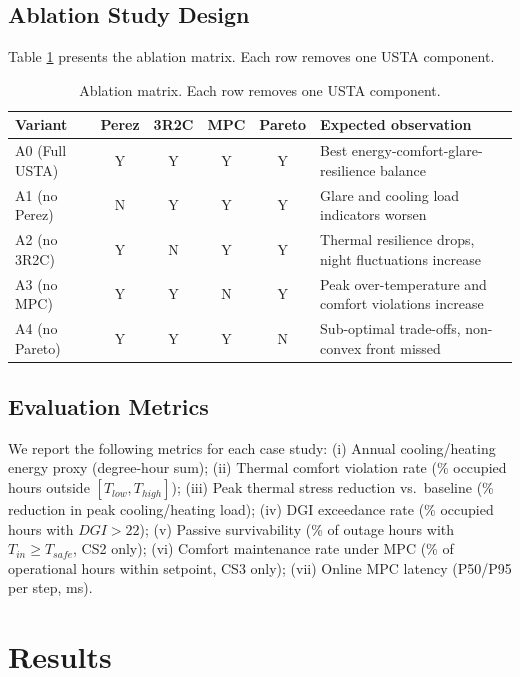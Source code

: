 \documentclass[5p,times,twocolumn]{elsarticle}
\begin{document}
\subsection{Ablation Study Design}

Table \ref{tab:ablation-design} presents the ablation matrix. Each row removes one USTA component.

\begin{table}[!t]
\centering
\small
\caption{Ablation matrix. Each row removes one USTA component.}
\label{tab:ablation-design}
\begin{tabularx}{\textwidth}{@{} l c c c c >{\raggedright\arraybackslash}X @{}}
\toprule
\textbf{Variant} & \textbf{Perez} & \textbf{3R2C} & \textbf{MPC} & \textbf{Pareto} & \textbf{Expected observation} \\
\midrule
A0 (Full USTA) & Y & Y & Y & Y & Best energy-comfort-glare-resilience balance \\
A1 (no Perez) & N & Y & Y & Y & Glare and cooling load indicators worsen \\
A2 (no 3R2C) & Y & N & Y & Y & Thermal resilience drops, night fluctuations increase \\
A3 (no MPC) & Y & Y & N & Y & Peak over-temperature and comfort violations increase \\
A4 (no Pareto) & Y & Y & Y & N & Sub-optimal trade-offs, non-convex front missed \\
\bottomrule
\end{tabularx}
\end{table}

\subsection{Evaluation Metrics}

We report the following metrics for each case study: (i) Annual cooling/heating energy proxy (degree-hour sum); (ii) Thermal comfort violation rate (\% occupied hours outside $[T_{low}, T_{high}]$); (iii) Peak thermal stress reduction vs.\ baseline (\% reduction in peak cooling/heating load); (iv) DGI exceedance rate (\% occupied hours with $DGI > 22$); (v) Passive survivability (\% of outage hours with $T_{in} \geq T_{safe}$, CS2 only); (vi) Comfort maintenance rate under MPC (\% of operational hours within setpoint, CS3 only); (vii) Online MPC latency (P50/P95 per step, ms).

\section{Results}
\label{sec:results}
\end{document}
